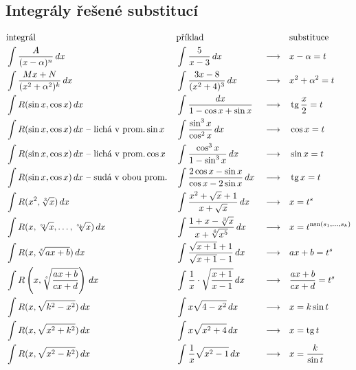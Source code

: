 \subsection*{Integrály řešené substitucí}
\begin{align*}
    &\textrm{integrál}                                & & \textrm{příklad}                                       & &                 & & \textrm{substituce}\\
    &\int \frac{A}{(x-\alpha)^n}\, dx                 & & \int \frac{5}{x-3}\, dx                                & & \longrightarrow & & x-\alpha=t \\
    &\int \frac{Mx+N}{(x^2+\alpha^2)^k}\, dx          & & \int \frac{3x-8}{(x^2+4)^3}\, dx                       & & \longrightarrow & & x^2+\alpha^2=t \\
    &\int R(\sin x, \cos x)\, dx                      & & \int \frac{dx}{1-\cos x+\sin x}                        & & \longrightarrow & & \operatorname{tg} \frac{x}{2}=t \\
    &\int R(\sin x, \cos x)\, dx \textrm{ -- lichá v prom.}\sin x                                               & & \int \frac{\sin^3 x}{\cos^2 x}\, dx                    & & \longrightarrow & & \cos x = t \\
    &\int R(\sin x, \cos x)\, dx \textrm{ -- lichá v prom.}\cos x                                               & & \int \frac{\cos^3 x}{1-\sin^3 x}\, dx                  & & \longrightarrow & & \sin x = t \\
    &\int R(\sin x, \cos x)\, dx \textrm{ -- sudá v obou prom.} & & \int \frac{2\cos x - \sin x}{\cos x - 2\sin x} \, dx   & & \longrightarrow & & \operatorname{tg} x = t \\
    &\int R(x^2,\sqrt[3]{x})\, dx                     & & \int \frac{x^2+\sqrt{x}+1}{x+\sqrt{x}}\, dx            & & \longrightarrow & & x=t^s \\
    &\int R(x,\sqrt[s_1]{x},\dots,\sqrt[s_k]{x})\, dx & & \int \frac{1+x-\sqrt[3]{x}}{x+\sqrt[6]{x^5}}\, dx      & & \longrightarrow & & x=t^{\textrm{nsn}(s_1,\dots,s_k)}\\
    &\int R(x,\sqrt[s]{ax+b})\, dx                    & & \int \frac{\sqrt{x+1}+1}{\sqrt{x+1}-1} \, dx           & & \longrightarrow & & ax+b=t^s \\
    &\int R\left(x,\sqrt[s]{\frac{ax+b}{cx+d}}\right)\, dx       & & \int \frac{1}{x}\cdot \sqrt{\frac{x+1}{x-1}} \, dx     & & \longrightarrow & & \frac{ax+b}{cx+d}=t^s \\
    &\int R(x,\sqrt{k^2-x^2}) \, dx                   & & \int x \sqrt{4-x^2}\, dx                               & & \longrightarrow & & x=k\sin t \\
    &\int R(x,\sqrt{x^2+k^2})\, dx                    & & \int x \sqrt{x^2+4} \, dx                              & & \longrightarrow & & x=\operatorname{tg} t \\
    &\int R(x,\sqrt{x^2-k^2} )\, dx                   & & \int \frac{1}{x}\sqrt{x^2-1}\, dx                      & & \longrightarrow & & x=\frac{k}{\sin t}
\end{align*}
